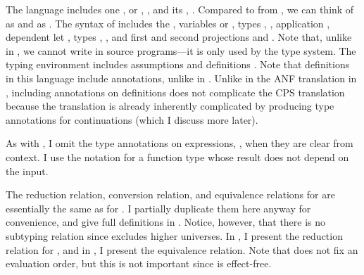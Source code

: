 The language includes one  , or
, \im{\sstarty}, and its , \im{\sboxty}.
Compared to \slang from , we can think of \im{\sstarty}
as \im{\spropty} and \im{\sboxty} as .
The syntax of  includes the  \im{\sstarty},
variables \im{\sx} or \im{\salpha},  types
\im{\spity{\sx}{\sA}{\sB}}, 
\im{\sfune{\sx}{\sA}{\se}}, application
\im{\sappe{\seone}{\setwo}}, dependent let
\im{\salete{\sx}{\se}{\sA}{\sepr}},  types
\im{\ssigmaty{\sx}{\sA}{\sB}}, 
\im{\sdpaire{\seone}{\setwo}{\ssigmaty{\sx}{\sA}{\sB}}}, and first and second
projections \im{\sfste{\se}} and \im{\ssnde{\se}}.
Note that, unlike in \slang, we cannot write \im{\sboxty} in source
programs---it is only used by the type system.
The typing environment \im{\slenv} includes assumptions \im{\sx:\sA} and
definitions \im{\sx = \se : \sA}.
Note that definitions in this language include annotations, unlike in \slang.
Unlike in the ANF translation in , including annotations on
definitions does not complicate the CPS translation because the 
translation is already inherently complicated by producing type annotations for
continuations (which I discuss more later).

As with , I omit the type annotations on 
expressions, \im{\slete{\sx}{\se}{\sepr}}, when they are clear from
context.
I use the notation \im{\sfunty{\sA}{\sB}} for a function type whose result
\im{\sB} does not depend on the input.

\FigCOCRed
\FigCOCEqv
The reduction relation, conversion relation, and equivalence relations for
\cpsslang are essentially the same as for \slang.
I partially duplicate them here anyway for convenience, and give full
definitions in .
Notice, however, that there is no subtyping relation since \cpsslang excludes
higher universes.
In , I present the reduction relation for \cpsslang,
and in , I present the equivalence relation.
Note that \cpsslang does not fix an evaluation order, but this is not important since
\cpsslang is effect-free.

